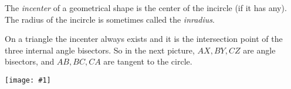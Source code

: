 \documentclass{article}
\newcommand{\figura}[1]{\begin{center}\texttt{[image: \#1]}\end{center}}
\begin{document}
The \emph{incenter} of a geometrical shape is the center of the
incircle (if it has any).  The radius of the incircle is sometimes
called the \emph{inradius}.

On a triangle the incenter always exists and it is the intersection
point of the three internal angle bisectors. So in the next picture,
$AX,BY,CZ$ are angle bisectors, and $AB,BC,CA$ are tangent to the
circle.
\figura{incentre}
\end{document}
